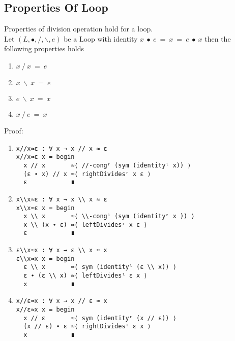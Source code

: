 \subsection{Properties Of Loop}
Properties of division operation hold for a loop.\\
Let $(L, ∙, /, \backslash, e)$ be a Loop with identity $x\ ∙\ e\ =\ x\ =\ e\ ∙\ x$
then the following properties holds 
\begin{enumerate}
\item \(x \ /\  x\ =\ e\) 
\item \( x\ \backslash \ x\ =\ e\)
\item \(e\ \backslash \ x\ =\ x\) 
\item \(x\ /\ e\ =\ x\) 
\end{enumerate}
Proof:
\begin{enumerate}
\item 
\begin{verbatim}
x//x≈ε : ∀ x → x // x ≈ ε
x//x≈ε x = begin
  x // x       ≈⟨ //-congʳ (sym (identityˡ x)) ⟩
  (ε ∙ x) // x ≈⟨ rightDividesʳ x ε ⟩
  ε            ∎
\end{verbatim}
\item
\begin{verbatim}
x\\x≈ε : ∀ x → x \\ x ≈ ε
x\\x≈ε x = begin
  x \\ x       ≈⟨ \\-congˡ (sym (identityʳ x )) ⟩
  x \\ (x ∙ ε) ≈⟨ leftDividesʳ x ε ⟩
  ε            ∎
\end{verbatim}
\item
\begin{verbatim}
ε\\x≈x : ∀ x → ε \\ x ≈ x
ε\\x≈x x = begin
  ε \\ x       ≈⟨ sym (identityˡ (ε \\ x)) ⟩
  ε ∙ (ε \\ x) ≈⟨ leftDividesˡ ε x ⟩
  x            ∎
\end{verbatim}
\item
\begin{verbatim}
x//ε≈x : ∀ x → x // ε ≈ x
x//ε≈x x = begin
  x // ε       ≈⟨ sym (identityʳ (x // ε)) ⟩
  (x // ε) ∙ ε ≈⟨ rightDividesˡ ε x ⟩
  x            ∎
\end{verbatim}
\end{enumerate}
